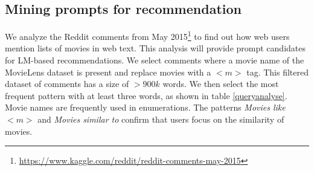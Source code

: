 \documentclass[runningheads]{llncs}
\begin{document}
\subsection{Mining prompts for recommendation}
 \vspace{-0.1cm}



 We analyze the Reddit comments from May 2015\footnote{\url{https://www.kaggle.com/reddit/reddit-comments-may-2015}} to find out how web users mention lists of movies in web text. This analysis will provide prompt candidates for LM-based recommendations.  We select comments where a movie name of the MovieLens dataset is present and replace movies with a ${<}m{>}$ tag.  This filtered dataset of comments has a size of $>900k$ words. We then select the most frequent pattern with at least three words, as shown in table \ref{queryanalyse}. Movie names are frequently used in enumerations. The patterns \textit{Movies like ${<}m{>}$} and \textit{Movies similar to } confirm that users focus on the similarity of movies.
\end{document}

